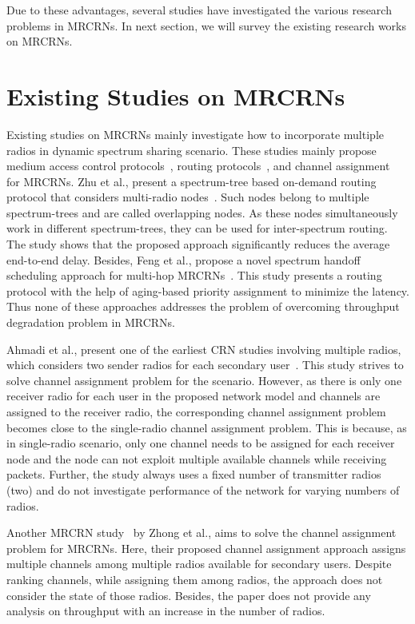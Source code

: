 Due to these advantages, several studies have investigated the various research problems in MRCRNs. In next section, we will survey the existing research works on MRCRNs.

\section{Existing Studies on MRCRNs}
Existing studies on MRCRNs mainly investigate how to incorporate multiple radios in dynamic spectrum sharing scenario. These studies mainly propose medium access control protocols~\cite{cormio2009survey, de2012survey}, routing protocols~\cite{zhu2008stod, feng2009joint}, and channel assignment~\cite{ahmadi2012distributed, zhong2014capacity} for MRCRNs. Zhu et al., present a spectrum-tree based on-demand routing protocol that considers multi-radio nodes~\cite{zhu2008stod}. Such nodes belong to multiple spectrum-trees and are called overlapping nodes. As these nodes simultaneously work in different spectrum-trees, they can be used for inter-spectrum routing. The study shows that the proposed approach significantly reduces the average end-to-end delay.  Besides, Feng et al., propose a novel spectrum handoff scheduling approach for multi-hop MRCRNs~\cite{feng2009joint}. This study presents a routing protocol with the help of aging-based priority assignment to minimize the latency. Thus none of these approaches addresses the problem of overcoming throughput degradation problem in MRCRNs.

Ahmadi et al., present one of the earliest CRN studies involving multiple radios, which considers two sender radios for each secondary user~\cite{ahmadi2012distributed}. This study strives to solve channel assignment problem for the scenario. However, as there is only one receiver radio for each user in the proposed network model and channels are assigned to the receiver radio, the corresponding channel assignment problem becomes close to the single-radio channel assignment problem. This is because, as in single-radio scenario, only one channel needs to be assigned for each receiver node and the node can not exploit multiple available channels while receiving packets. Further, the study always uses a fixed number of transmitter radios (two) and do not investigate performance of the network for varying numbers of radios.

Another MRCRN study~\cite{zhong2014capacity} by Zhong et al., aims to solve the channel assignment problem for MRCRNs. Here, their proposed channel assignment approach assigns multiple channels among multiple radios available for secondary users. Despite ranking channels, while assigning them among radios, the approach does not consider the state of those radios. Besides, the paper does not provide any analysis on throughput with an increase in the number of radios.

